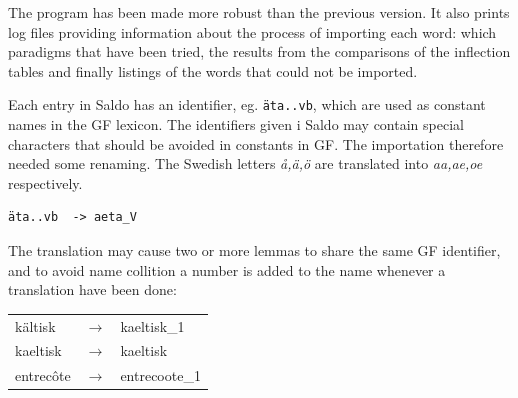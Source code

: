 \documentclass{report}
\begin{document}
The program has been made more robust than the previous version. It also prints
log files providing
information about the process of importing each word: which paradigms that have been
tried, the results from the comparisons of the inflection tables and finally listings
of the words that could not be imported.

Each entry in Saldo has an identifier, eg. \verb-äta..vb-, which are used as 
constant names in the GF lexicon. The identifiers given i Saldo may contain
special characters that should be avoided in constants in GF. The importation therefore
needed some renaming. The Swedish letters \emph{å,ä,ö} are translated into
\emph{aa,ae,oe} respectively. 
\begin{verbatim}äta..vb  -> aeta_V \end{verbatim}
The translation may cause two or more lemmas to share the same
GF identifier, and to avoid name collition a number is added to the name
whenever a translation have been done: 
\begin{tabular}{lll}
kältisk & $\rightarrow$ & kaeltisk\_1 \\
kaeltisk & $\rightarrow$ & kaeltisk \\
entrecôte &$\rightarrow$ & entrecoote\_1 \\ 
\end{tabular}\\


\end{document}
